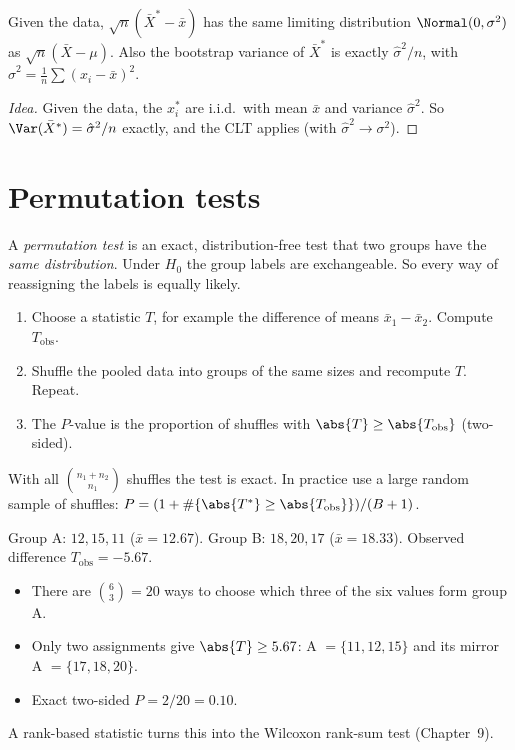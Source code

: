 \begin{theorem}\label{thm:bootstrap-mean}
Given the data, $\sqrt n(\bar{X}^*-\bar{x})$ has the same limiting distribution $\Normal(0,\sigma^2)$ as $\sqrt n(\bar{X}-\mu)$. Also the bootstrap variance of $\bar{X}^*$ is exactly $\hat\sigma^2/n$, with $\hat\sigma^2=\frac1n\sum(x_i-\bar{x})^2$.
\end{theorem}

\begin{proof}[Idea]
Given the data, the $x_i^*$ are i.i.d.\ with mean $\bar{x}$ and variance $\hat\sigma^2$. So $\Var(\bar{X}^*)=\hat\sigma^2/n$ exactly, and the CLT applies (with $\hat\sigma^2\to\sigma^2$).
\end{proof}

\section{Permutation tests}

A \emph{permutation test} is an exact, distribution-free test that two groups have the \emph{same distribution}. Under $H_0$ the group labels are exchangeable. So every way of reassigning the labels is equally likely.

\begin{definition}
\begin{enumerate}
  \item Choose a statistic $T$, for example the difference of means $\bar{x}_1-\bar{x}_2$. Compute $T_{\mathrm{obs}}$.
  \item Shuffle the pooled data into groups of the same sizes and recompute $T$. Repeat.
  \item The $P$-value is the proportion of shuffles with $\abs{T}\ge\abs{T_{\mathrm{obs}}}$ (two-sided).
\end{enumerate}
With all $\binom{n_1+n_2}{n_1}$ shuffles the test is exact. In practice use a large random sample of shuffles: $P=(1+\#\{\abs{T^*}\ge\abs{T_{\mathrm{obs}}}\})/(B+1)$.
\end{definition}

\begin{example}
Group A: $12,15,11$ ($\bar{x}=12.67$). Group B: $18,20,17$ ($\bar{x}=18.33$). Observed difference $T_{\mathrm{obs}}=-5.67$.
\begin{itemize}
  \item There are $\binom63=20$ ways to choose which three of the six values form group A.
  \item Only two assignments give $\abs{T}\ge5.67$: A $=\{11,12,15\}$ and its mirror A $=\{17,18,20\}$.
  \item Exact two-sided $P=2/20=0.10$.
\end{itemize}
A rank-based statistic turns this into the Wilcoxon rank-sum test (Chapter~9).
\end{example}

